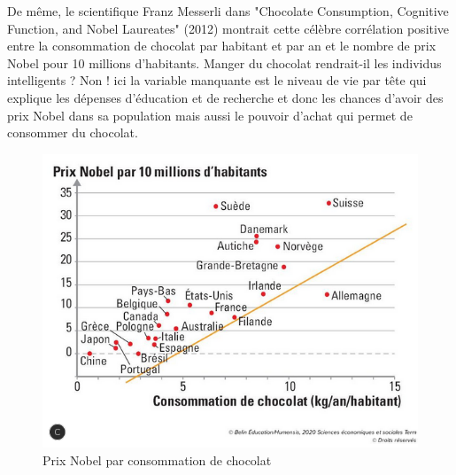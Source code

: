 \documentclass[10pt, a4paper]{article}
\begin{document}
De même, le scientifique Franz Messerli dans "Chocolate Consumption, Cognitive Function, and Nobel Laureates" (2012) montrait cette célèbre corrélation positive entre la consommation de chocolat par habitant et par an et le nombre de prix Nobel pour 10 millions d'habitants. Manger du chocolat rendrait-il les individus intelligents ? Non ! ici la variable manquante est le niveau de vie par tête qui explique les dépenses d'éducation et de recherche et donc les chances d'avoir des prix Nobel dans sa population mais aussi le pouvoir d'achat qui permet de consommer du chocolat.
\begin{figure}[h]
    \centering
    \includegraphics[scale=0.5]{chapitre1/figures/causaliteCorrelation.png}
    \caption{Prix Nobel par consommation de chocolat}
    \label{fig:enter-label}
\end{figure}
\end{document}
